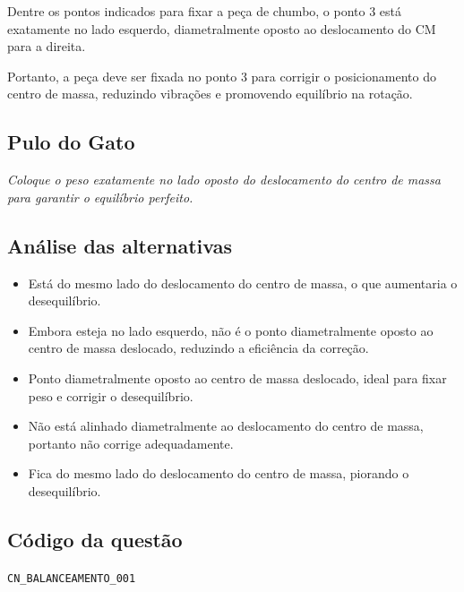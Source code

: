 \documentclass{article}
\begin{document}
Dentre os pontos indicados para fixar a peça de chumbo, o ponto 3 está exatamente no lado esquerdo, diametralmente oposto ao deslocamento do CM para a direita.

Portanto, a peça deve ser fixada no ponto 3 para corrigir o posicionamento do centro de massa, reduzindo vibrações e promovendo equilíbrio na rotação.

\subsection*{Pulo do Gato}

\textit{Coloque o peso exatamente no lado oposto do deslocamento do centro de massa para garantir o equilíbrio perfeito.}

\subsection*{Análise das alternativas}
\begin{itemize}
  \item[A:] Está do mesmo lado do deslocamento do centro de massa, o que aumentaria o desequilíbrio.
  \item[B:] Embora esteja no lado esquerdo, não é o ponto diametralmente oposto ao centro de massa deslocado, reduzindo a eficiência da correção.
  \item[C:] Ponto diametralmente oposto ao centro de massa deslocado, ideal para fixar peso e corrigir o desequilíbrio.
  \item[D:] Não está alinhado diametralmente ao deslocamento do centro de massa, portanto não corrige adequadamente.
  \item[E:] Fica do mesmo lado do deslocamento do centro de massa, piorando o desequilíbrio.
\end{itemize}

\subsection*{Código da questão}
\texttt{CN\_BALANCEAMENTO\_001}
\end{document}
